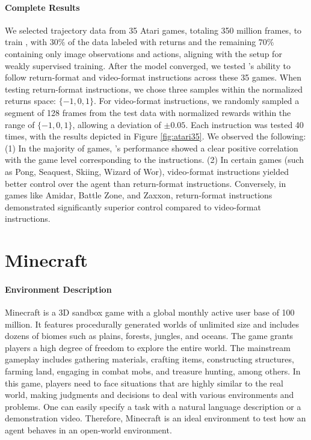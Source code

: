 \paragraph{Complete Results} \label{appendix:complete-atari-results}
We selected trajectory data from 35 Atari games, totaling 350 million frames, to train \agent, with $30\%$ of the data labeled with returns and the remaining $70\%$ containing only image observations and actions, aligning with the setup for weakly supervised training. After the model converged, we tested \agent's ability to follow return-format and video-format instructions across these 35 games. When testing return-format instructions, we chose three samples within the normalized returns space: $\{-1, 0, 1\}$. For video-format instructions, we randomly sampled a segment of 128 frames from the test data with normalized rewards within the range of $\{-1, 0, 1\}$, allowing a deviation of $\pm 0.05$. Each instruction was tested 40 times, with the results depicted in Figure \ref{fig:atari35}. We observed the following: (1) In the majority of games, \agent's performance showed a clear positive correlation with the game level corresponding to the instructions. (2) In certain games (such as Pong, Seaquest, Skiing, Wizard of Wor), video-format instructions yielded better control over the agent than return-format instructions. Conversely, in games like Amidar, Battle Zone, and Zaxxon, return-format instructions demonstrated significantly superior control compared to video-format instructions. 


\section{Minecraft} \label{appendix:minecraft}

\paragraph{Environment Description} Minecraft is a 3D sandbox game with a global monthly active user base of 100 million. It features procedurally generated worlds of unlimited size and includes dozens of biomes such as plains, forests, jungles, and oceans. The game grants players a high degree of freedom to explore the entire world. The mainstream gameplay includes gathering materials, crafting items, constructing structures, farming land, engaging in combat mobs, and treasure hunting, among others. In this game, players need to face situations that are highly similar to the real world, making judgments and decisions to deal with various environments and problems. One can easily specify a task with a natural language description or a demonstration video. Therefore, Minecraft is an ideal environment to test how an agent behaves in an open-world environment. 

